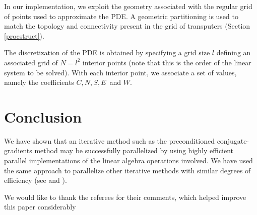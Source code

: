 \documentclass{ecai}  %
\begin{document}
In our implementation, we exploit the geometry associated with the
regular grid of points used to approximate the PDE. A geometric
partitioning is used to match the topology and connectivity present in
the grid of transputers (Section \ref{procstruct}).

The discretization of the PDE is obtained by specifying a grid size
$l$ defining an associated grid of $N=l^2$ interior points (note that
this is the order of the linear system to be solved). With each
interior point, we associate a set of values, namely the coefficients
$C, N, S, E\,$ and $W$.

\section{Conclusion}
We have shown that an iterative method such as the preconditioned
conjugate-gradients method may be successfully parallelized by using
highly efficient parallel implementations of the linear algebra
operations involved. We have used the same approach to parallelize
other iterative methods with similar degrees of efficiency (see
\cite{kn:daCunha92a} and \cite {kn:daCunha92b}).

\ack We would like to thank the referees for their comments, which
helped improve this paper considerably


\end{document}
